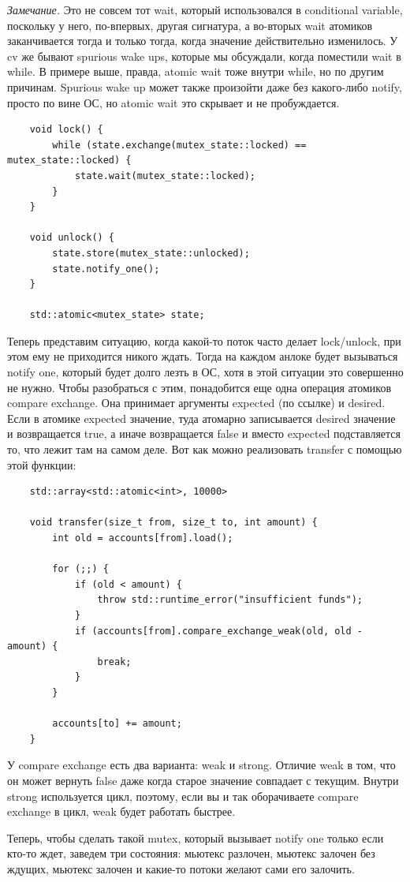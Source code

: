\documentclass[12pt, a4paper]{article}
\begin{document}
\textit{Замечание.} Это не совсем тот wait, который использовался в conditional variable, поскольку у него, по-впервых, другая сигнатура, а во-вторых wait атомиков заканчивается тогда и только тогда, когда значение действительно изменилось. У cv же бывают spurious wake ups, которые мы обсуждали, когда поместили wait в while. В примере выше, правда, atomic wait тоже внутри while, но по другим причинам. Spurious wake up может также произойти даже без какого-либо notify, просто по вине ОС, но atomic wait это скрывает и не пробуждается.
\begin{verbatim}
	void lock() {
		while (state.exchange(mutex_state::locked) == mutex_state::locked) {
			state.wait(mutex_state::locked);
		}
	}
	
	void unlock() {
		state.store(mutex_state::unlocked);
		state.notify_one();
	}
	
	std::atomic<mutex_state> state;
\end{verbatim}
Теперь представим ситуацию, когда какой-то поток часто делает lock/unlock, при этом ему не приходится никого ждать. Тогда на каждом анлоке будет вызываться notify one, который будет долго лезть в ОС, хотя в этой ситуации это совершенно не нужно. Чтобы разобраться с этим, понадобится еще одна операция атомиков compare exchange. Она принимает аргументы expected (по ссылке) и desired. Если в атомике expected значение, туда атомарно записывается desired значение и возвращается true, а иначе возвращается false и вместо expected подставляется то, что лежит там на самом деле. Вот как можно реализовать transfer с помощью этой функции:
\begin{verbatim}
	std::array<std::atomic<int>, 10000>
	
	void transfer(size_t from, size_t to, int amount) {
		int old = accounts[from].load();
		
		for (;;) {
			if (old < amount) {
				throw std::runtime_error("insufficient funds");
			}
			if (accounts[from].compare_exchange_weak(old, old - amount) {
				break;
			}
		}
		
		accounts[to] += amount;
	}
\end{verbatim}
У compare exchange есть два варианта: weak и strong. Отличие weak в том, что он может вернуть false даже когда старое значение совпадает с текущим. Внутри strong используется цикл, поэтому, если вы и так оборачиваете compare exchange в цикл, weak будет работать быстрее.
\par Теперь, чтобы сделать такой mutex, который вызывает notify one только если кто-то ждет, заведем три состояния: мьютекс разлочен, мьютекс залочен без ждущих, мьютекс залочен и какие-то потоки желают сами его залочить. 
\end{document}
